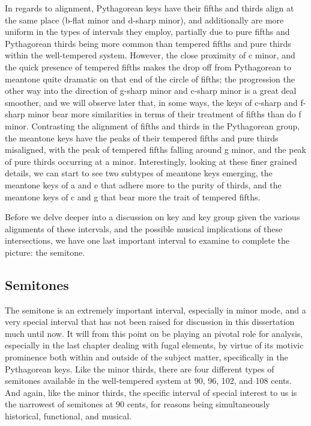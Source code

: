 In regards to alignment, Pythagorean keys have their fifths and thirds
align at the same place (b-flat minor and d-sharp minor), and
additionally are more uniform in the types of intervals they employ,
partially due to pure fifths and Pythagorean thirds being more common
than tempered fifths and pure thirds within the well-tempered system.
However, the close proximity of c minor, and the quick presence of
tempered fifths makes the drop off from Pythagorean to meantone quite
dramatic on that end of the circle of fifths; the progression the other
way into the direction of g-sharp minor and c-sharp minor is a great
deal smoother, and we will observe later that, in some ways, the keys of
c-sharp and f-sharp minor bear more similarities in terms of their
treatment of fifths than do f minor. Contrasting the alignment of fifths
and thirds in the Pythagorean group, the meantone keys have the peaks of
their tempered fifths and pure thirds misaligned, with the peak of
tempered fifths falling around g minor, and the peak of pure thirds
occurring at a minor. Interestingly, looking at these finer grained
details, we can start to see two subtypes of meantone keys emerging, the
meantone keys of a and e that adhere more to the purity of thirds, and
the meantone keys of c and g that bear more the trait of tempered
fifths.

Before we delve deeper into a discussion on key and key group given the
various alignments of these intervals, and the possible musical
implications of these intersections, we have one last important interval
to examine to complete the picture: the semitone.

    \subsection{Semitones}\label{semitones}

The semitone is an extremely important interval, especially in minor
mode, and a very special interval that has not been raised for
discussion in this dissertation much until now. It will from this point
on be playing an pivotal role for analysis, especially in the last
chapter dealing with fugal elements, by virtue of its motivic prominence
both within and outside of the subject matter, specifically in the
Pythagorean keys. Like the minor thirds, there are four different types
of semitones available in the well-tempered system at 90, 96, 102, and
108 cents. And again, like the minor thirds, the specific interval of
special interest to us is the narrowest of semitones at 90 cents, for
reasons being simultaneously historical, functional, and musical.

